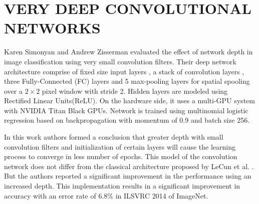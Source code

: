\documentclass{article}
\begin{document}
\section{VERY DEEP CONVOLUTIONAL NETWORKS }
Karen Simonyan and Andrew Zisserman \cite{Arge2015} evaluated the effect of network depth in image classification using very small convolution filters. Their deep network architecture comprise of fixed  size input layers , a stack of convolution layers , three Fully-Connected (FC) layers and  5 max-pooling layers for spatial spooling  over a $2 \times 2$ pixel window with stride 2. Hidden layers are modeled using Rectified Linear Units(ReLU)\cite{Nair2010}. On the hardware side, it uses a multi-GPU system with NVIDIA Titan Black GPUs. Network is trained using multinomial logistic regression  based on backpropagation with momentum of 0.9 and  batch size  256.
\par
 In this work authors formed a conclusion that greater depth with small convolution filters and  initialization of certain layers will cause the learning process to converge in less number  of epochs. This model of the convolution network does not differ from the classical architecture proposed by  LeCun et  al. \cite{LeCun1998}. But the authors reported a significant improvement in the performance using an increased depth.  This implementation results in a significant improvement in accuracy with  an error rate of  6.8\% in  ILSVRC 2014 of ImageNet.
\end{document}
